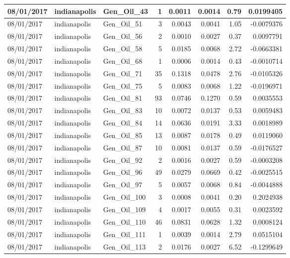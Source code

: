\documentclass[
  letterpaper,
  DIV=11,
  numbers=noendperiod]{scrartcl}
\begin{document}
\begin{tabular}{l|l|l|r|r|r|r|r}
\hline
08/01/2017 & indianapolis & Gen\_Oil\_43 & 1 & 0.0011 & 0.0014 & 0.79 & 0.0199405\\
\hline
08/01/2017 & indianapolis & Gen\_Oil\_51 & 3 & 0.0043 & 0.0041 & 1.05 & -0.0079376\\
\hline
08/01/2017 & indianapolis & Gen\_Oil\_56 & 2 & 0.0010 & 0.0027 & 0.37 & 0.0097791\\
\hline
08/01/2017 & indianapolis & Gen\_Oil\_58 & 5 & 0.0185 & 0.0068 & 2.72 & -0.0663381\\
\hline
08/01/2017 & indianapolis & Gen\_Oil\_68 & 1 & 0.0006 & 0.0014 & 0.43 & -0.0010714\\
\hline
08/01/2017 & indianapolis & Gen\_Oil\_71 & 35 & 0.1318 & 0.0478 & 2.76 & -0.0105326\\
\hline
08/01/2017 & indianapolis & Gen\_Oil\_75 & 5 & 0.0083 & 0.0068 & 1.22 & -0.0196971\\
\hline
08/01/2017 & indianapolis & Gen\_Oil\_81 & 93 & 0.0746 & 0.1270 & 0.59 & 0.0035553\\
\hline
08/01/2017 & indianapolis & Gen\_Oil\_83 & 10 & 0.0072 & 0.0137 & 0.53 & 0.0059483\\
\hline
08/01/2017 & indianapolis & Gen\_Oil\_84 & 14 & 0.0636 & 0.0191 & 3.33 & 0.0018989\\
\hline
08/01/2017 & indianapolis & Gen\_Oil\_85 & 13 & 0.0087 & 0.0178 & 0.49 & 0.0119060\\
\hline
08/01/2017 & indianapolis & Gen\_Oil\_87 & 10 & 0.0081 & 0.0137 & 0.59 & -0.0176527\\
\hline
08/01/2017 & indianapolis & Gen\_Oil\_92 & 2 & 0.0016 & 0.0027 & 0.59 & -0.0003208\\
\hline
08/01/2017 & indianapolis & Gen\_Oil\_96 & 49 & 0.0279 & 0.0669 & 0.42 & -0.0025515\\
\hline
08/01/2017 & indianapolis & Gen\_Oil\_97 & 5 & 0.0057 & 0.0068 & 0.84 & -0.0044888\\
\hline
08/01/2017 & indianapolis & Gen\_Oil\_100 & 3 & 0.0008 & 0.0041 & 0.20 & 0.2024938\\
\hline
08/01/2017 & indianapolis & Gen\_Oil\_109 & 4 & 0.0017 & 0.0055 & 0.31 & 0.0023592\\
\hline
08/01/2017 & indianapolis & Gen\_Oil\_110 & 46 & 0.0831 & 0.0628 & 1.32 & 0.0008124\\
\hline
08/01/2017 & indianapolis & Gen\_Oil\_111 & 1 & 0.0039 & 0.0014 & 2.79 & 0.0515104\\
\hline
08/01/2017 & indianapolis & Gen\_Oil\_113 & 2 & 0.0176 & 0.0027 & 6.52 & -0.1299649\\

\end{tabular}
\end{document}
